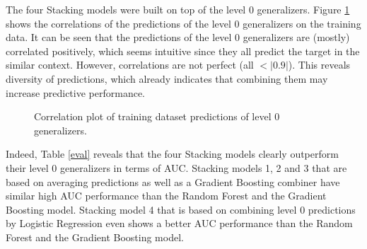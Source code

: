 \documentclass[12pt]{article}
\begin{document}
\noindent The four Stacking models were built on top of the level 0 generalizers. Figure \ref{corrgram} shows the correlations of the predictions of the level 0 generalizers on the training data. It can be seen that the predictions of the level 0 generalizers are (mostly) correlated positively, which seems intuitive since they all predict the target in the similar context. However, correlations are not perfect (all $<|0.9|$). This reveals diversity of predictions, which already indicates that combining them may increase predictive performance.

\begin{figure}[htp] 
\caption[Correlation of predictions]{Correlation plot of training dataset predictions of level 0 generalizers.}\label{corrgram}
\end{figure}  

Indeed, Table \ref{eval} reveals that the four Stacking models clearly outperform their level 0 generalizers in terms of AUC. Stacking models 1, 2 and 3 that are based on averaging predictions as well as a Gradient Boosting combiner have similar high AUC performance than the Random Forest and the Gradient Boosting model. Stacking model 4 that is based on combining level 0 predictions by Logistic Regression even shows a better AUC performance than the Random Forest and the Gradient Boosting model. 
\end{document}
